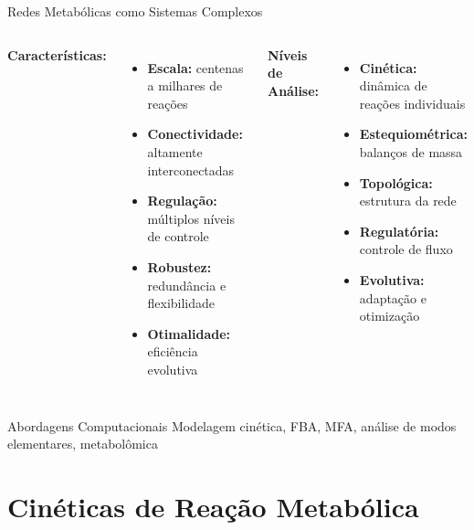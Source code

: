 \begin{frame}{Redes Metabólicas como Sistemas Complexos}
\begin{columns}
\textbf{Características:}
\begin{itemize}
    \item \textbf{Escala:} centenas a milhares de reações
    \item \textbf{Conectividade:} altamente interconectadas
    \item \textbf{Regulação:} múltiplos níveis de controle
    \item \textbf{Robustez:} redundância e flexibilidade
    \item \textbf{Otimalidade:} eficiência evolutiva
\end{itemize}

\textbf{Níveis de Análise:}
\begin{itemize}
    \item \textbf{Cinética:} dinâmica de reações individuais
    \item \textbf{Estequiométrica:} balanços de massa
    \item \textbf{Topológica:} estrutura da rede
    \item \textbf{Regulatória:} controle de fluxo
    \item \textbf{Evolutiva:} adaptação e otimização
\end{itemize}
\end{columns}

\vspace{0.3cm}

\begin{exampleblock}{Abordagens Computacionais}
Modelagem cinética, FBA, MFA, análise de modos elementares, metabolômica
\end{exampleblock}
\end{frame}

\section{Cinéticas de Reação Metabólica}

